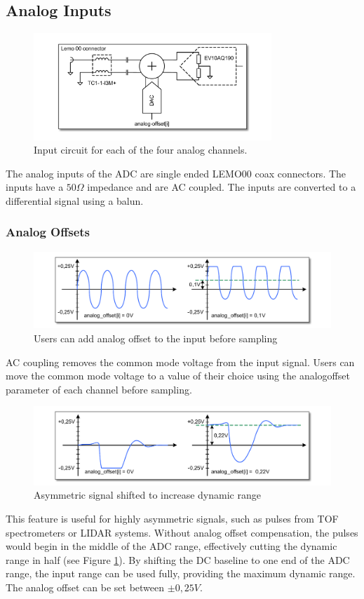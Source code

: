 \subsection{Analog Inputs}
%
\begin{figure}[ht]
    \centering
    \includegraphics[width=0.8\textwidth]{figures/InputCircuit.pdf}
    \caption{Input circuit for each of the four analog channels.}
\end{figure}
%
The analog inputs of the ADC are single ended LEMO00 coax connectors. The inputs have a $50\Omega$ impedance and are AC coupled. The inputs are converted to a differential signal using a balun.
%
%
%
\subsubsection{Analog Offsets}
%
\begin{figure}[ht]
    \centering
    \includegraphics[width=\textwidth]{figures/AnalogOffset_Sine.pdf}
    \caption{Users can add analog offset to the input before sampling}
\end{figure}	
%
AC coupling removes the common mode voltage from the input signal. Users can move the common mode voltage to a value of their choice using the analog\tu offset parameter of each channel before sampling.\par
%
\begin{figure}[!ht]
    \centering
    \includegraphics[width=\textwidth]{figures/AnalogOffset_Pulse.pdf}
    \caption{Asymmetric signal shifted to increase dynamic range\label{fig:shiftInput}}
\end{figure}	
%
This feature is useful for highly asymmetric signals, such as pulses from TOF spectrometers or LIDAR systems. Without analog offset compensation, the pulses would begin in the middle of the ADC range, effectively cutting the dynamic range in half (see Figure \ref{fig:shiftInput}). By shifting the DC baseline to one end of the ADC range, the input range can be used fully, providing the maximum dynamic range. The analog offset can be set between $\pm 0,25V$.
%
%
%
